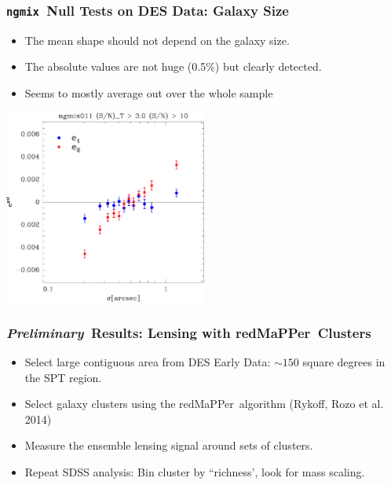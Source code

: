 \documentclass{beamer}
\newcommand{\ngmix}{\texttt{ngmix}}
\newcommand{\redmapper}{redMaPPer}
\newcommand{\prelim}{{\bf{\it Preliminary}}}
\begin{document}
\frame
{
    \frametitle{\ngmix\ Null Tests on DES Data: Galaxy Size}

    \begin{itemize}

        \item The mean shape should not depend on the galaxy size.

        \item The absolute values are not huge (0.5\%) but clearly detected.
        
        \item Seems to mostly average out over the whole sample

    \end{itemize}


    \begin{center}
        \includegraphics[width=0.5\textwidth]{ngmix011-e-vs-sigma-mx-50-Ts2n-min-300-s2n-min-10.pdf}
    \end{center}

}



\frame
{
    \frametitle{\prelim\ Results: Lensing with \redmapper\ Clusters}
    
    \begin{itemize}

        \item Select large contiguous area from DES Early Data: $\sim 150$ square degrees
            in the SPT region.

        \item Select galaxy clusters using the \redmapper\ algorithm (Rykoff, Rozo et al. 2014)

        \item Measure the ensemble lensing signal around sets of clusters.

        \item Repeat SDSS analysis: Bin cluster by ``richness', look for mass scaling.


    \end{itemize}
}
\end{document}
